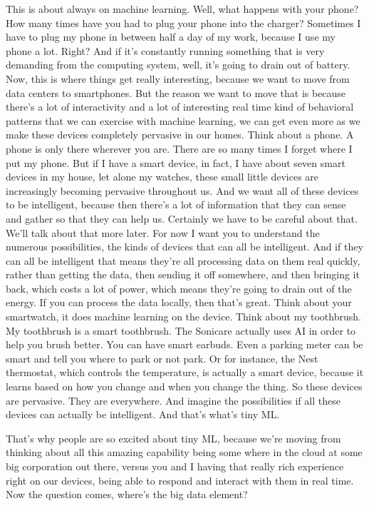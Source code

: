 This is about always on machine learning.
Well, what happens with your phone?
How many times have you had to plug your phone into the charger?
Sometimes I have to plug my phone in between half a day of my work, because I use my phone a lot.
Right?
And if it's constantly running something that is very demanding from the computing system, well, it's going to drain out of battery.
Now, this is where things get really interesting, because we want to move from data centers to smartphones.
But the reason we want to move that is because there's a lot of interactivity and a lot of interesting real time kind of behavioral patterns that we can exercise with machine learning, we can get even more as we make these devices completely pervasive in our homes.
Think about a phone.
A phone is only there wherever you are.
There are so many times I forget where I put my phone.
But if I have a smart device, in fact, I have about seven smart devices in my house, let alone my watches, these small little devices are increasingly becoming pervasive throughout us.
And we want all of these devices to be intelligent, because then there's a lot of information that they can sense and gather so that they can help us.
Certainly we have to be careful about that.
We'll talk about that more later.
For now I want you to understand the numerous possibilities, the kinds of devices that can all be intelligent.
And if they can all be intelligent that means they're all processing data on them real quickly, rather than getting the data, then sending it off somewhere, and then bringing it back, which costs a lot of power, which means they're going to drain out of the energy.
If you can process the data locally, then that's great.
Think about your smartwatch, it does machine learning on the device.
Think about my toothbrush.
My toothbrush is a smart toothbrush.
The Sonicare actually uses AI in order to help you brush better.
You can have smart earbuds.
Even a parking meter can be smart and tell you where to park or not park.
Or for instance, the Nest thermostat, which controls the temperature, is actually a smart device, because it learns based on how you change and when you change the thing.
So these devices are pervasive.
They are everywhere.
And imagine the possibilities if all these devices can actually be intelligent.
And that's what's tiny ML.



That's why people are so excited about tiny ML, because we're moving from thinking about all this amazing capability being some where in the cloud at some big corporation out there, versus you and I having that really rich experience right on our devices, being able to respond and interact with them in real time.
Now the question comes, where's the big data element?

